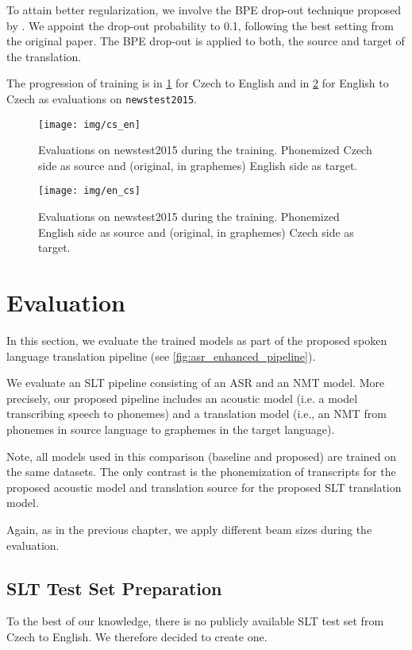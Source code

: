 To attain better regularization, we involve the BPE drop-out technique proposed by . We appoint the drop-out probability to 0.1, following the best setting from the original paper. The BPE drop-out is applied to both, the source and target of the translation.

The progression of training is in \cref{fig:cs_en} for Czech to English and in \cref{fig:en_cs} for English to Czech as evaluations on \texttt{newstest2015}.

\begin{figure}[h]
	\texttt{[image: img/cs\_en]}
	\caption[Czech to English training]{Evaluations on newstest2015 during the training. Phonemized Czech side as source and (original, in graphemes) English side as target.}
	\label{fig:cs_en}
\end{figure}

\begin{figure}[h]
	\texttt{[image: img/en\_cs]}
	\caption[English to Czech training]{Evaluations on newstest2015 during the training. Phonemized English side as source and (original, in graphemes) Czech side as target.}
	\label{fig:en_cs}
\end{figure}

\section{Evaluation}
\label{slt:evaluation}
In this section, we evaluate the trained models as part of the proposed spoken language translation pipeline (see \cref{fig:asr_enhanced_pipeline}).

We evaluate an SLT pipeline consisting of an ASR and an NMT model. More precisely, our proposed pipeline includes an acoustic model (i.e. a model transcribing speech to phonemes) and a translation model (i.e., an NMT from phonemes in source language to graphemes in the target language). 

Note, all models used in this comparison (baseline and proposed) are trained on the same datasets. The only contrast is the phonemization of transcripts for the proposed acoustic model and translation source for the proposed SLT translation model.

Again, as in the previous chapter, we apply different beam sizes during the evaluation.

\subsection{SLT Test Set Preparation}
\label{read-newstest}
To the best of our knowledge, there is no publicly available SLT test set from Czech to English. We therefore decided to create one.


